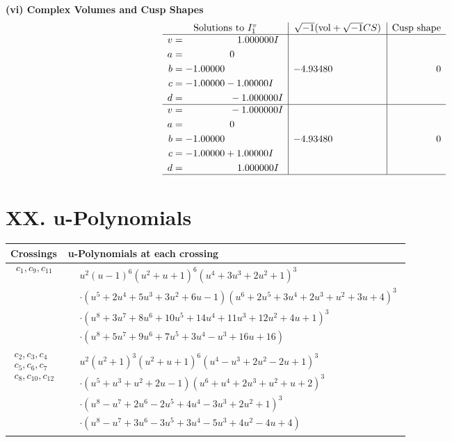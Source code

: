 \documentclass[1p]{elsarticle_modified}
\theoremstyle{definition}
\newcommand{\I}{\sqrt{-1}}
\begin{document}
\newpage\flushleft \textbf{(vi) Complex Volumes and Cusp Shapes}
$$\begin{array}{c|c|c}  
\text{Solutions to }I^v_{1}& \I (\text{vol} + \sqrt{-1}CS) & \text{Cusp shape}\\
 \hline 
\begin{aligned}
v &= \phantom{-0.000000 -}1.000000 I \\
a &= \phantom{-0.000000 } 0 \\
b &= -1.00000\phantom{ +0.000000I} \\
c &= -1.00000 - 1.00000 I \\
d &= \phantom{-0.000000 } -1.000000 I\end{aligned}
 & -4.93480\phantom{ +0.000000I} & \phantom{-0.000000 } 0 \\ \hline\begin{aligned}
v &= \phantom{-0.000000 } -1.000000 I \\
a &= \phantom{-0.000000 } 0 \\
b &= -1.00000\phantom{ +0.000000I} \\
c &= -1.00000 + 1.00000 I \\
d &= \phantom{-0.000000 -}1.000000 I\end{aligned}
 & -4.93480\phantom{ +0.000000I} & \phantom{-0.000000 } 0\\
 \hline 
 \end{array}$$\newpage
\newpage\renewcommand{\arraystretch}{1}
\centering \section*{ XX. u-Polynomials}
\begin{tabular}{m{50pt}|m{274pt}}
Crossings & \hspace{64pt}u-Polynomials at each crossing \\
\hline $$\begin{aligned}c_{1},c_{9},c_{11}\end{aligned}$$&$\begin{aligned}
&u^2(u-1)^6(u^2+u+1)^6(u^4+3 u^3+2 u^2+1)^3\\
&\cdot(u^5+2 u^4+5 u^3+3 u^2+6 u-1)(u^6+2 u^5+3 u^4+2 u^3+u^2+3 u+4)^{3}\\
&\cdot(u^8+3 u^7+8 u^6+10 u^5+14 u^4+11 u^3+12 u^2+4 u+1)^3\\
&\cdot(u^8+5 u^7+9 u^6+7 u^5+3 u^4- u^3+16 u+16)
\end{aligned}$\\
\hline $$\begin{aligned}c_{2},c_{3},c_{4}\\c_{5},c_{6},c_{7}\\c_{8},c_{10},c_{12}\end{aligned}$$&$\begin{aligned}
&u^2(u^2+1)^3(u^2+u+1)^6(u^4- u^3+2 u^2-2 u+1)^3\\
&\cdot(u^5+u^3+u^2+2 u-1)(u^6+u^4+2 u^3+u^2+u+2)^3\\
&\cdot(u^8- u^7+2 u^6-2 u^5+4 u^4-3 u^3+2 u^2+1)^3\\
&\cdot(u^8- u^7+3 u^6-3 u^5+3 u^4-5 u^3+4 u^2-4 u+4)
\end{aligned}$\\
\hline
\end{tabular}\newpage\renewcommand{\arraystretch}{1}
\end{document}
